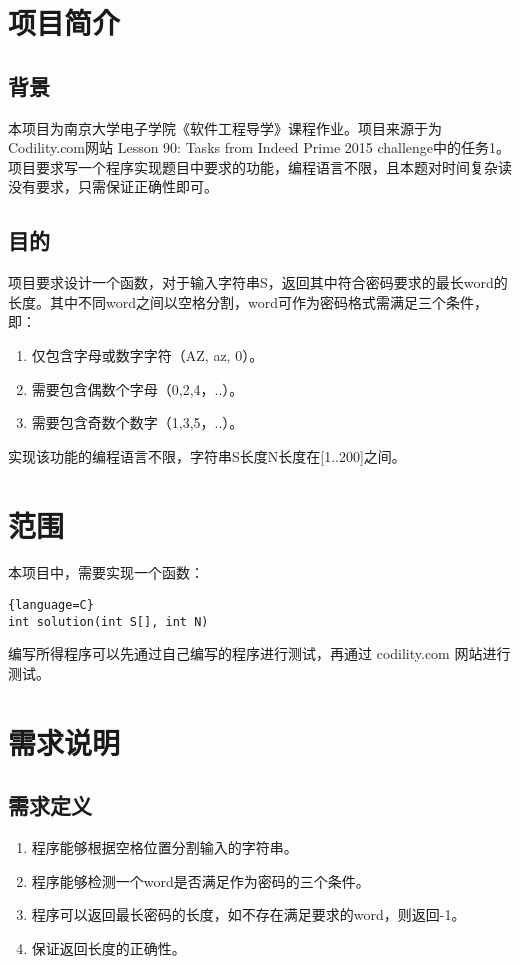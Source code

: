 




% 

\begin{spacing}{1.5}
\songti{}
\setcounter{page}{1}
    \section{项目简介}
    \subsection{背景}
    本项目为南京大学电子学院《软件工程导学》课程作业。项目来源于为Codility.com网站 Lesson 90: Tasks from Indeed Prime 2015 challenge中的任务1。 
    项目要求写一个程序实现题目中要求的功能，编程语言不限，且本题对时间复杂读没有要求，只需保证正确性即可。

    \subsection{目的}
    项目要求设计一个函数，对于输入字符串S，返回其中符合密码要求的最长word的长度。其中不同word之间以空格分割，word可作为密码格式需满足三个条件，即：
    \begin{enumerate} [\indent (1)]
            \item 仅包含字母或数字字符（A\-Z, a\-z, 0）。
            \item 需要包含偶数个字母（0,2,4，..）。
            \item 需要包含奇数个数字（1,3,5，..）。
    \end{enumerate}

    实现该功能的编程语言不限，字符串S长度N长度在[1..200]之间。
    
    \section{范围}
    本项目中，需要实现一个函数：

\begin{lstlisting}{language=C}
int solution(int S[], int N)
\end{lstlisting}

    编写所得程序可以先通过自己编写的程序进行测试，再通过 codility.com 网站进行测试。

    \section{需求说明}
    \subsection{需求定义}
    \begin{enumerate} [\indent 1、]
        \item 程序能够根据空格位置分割输入的字符串。
        \item 程序能够检测一个word是否满足作为密码的三个条件。
        \item 程序可以返回最长密码的长度，如不存在满足要求的word，则返回-1。
        \item 保证返回长度的正确性。
    \end{enumerate}


\end{spacing}
